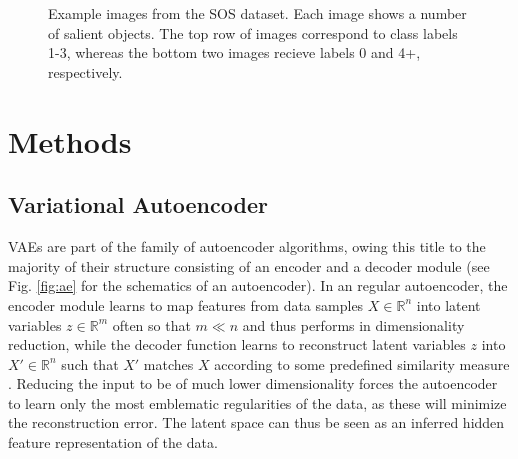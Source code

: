\documentclass[twocolumn]{article}
\begin{document}
\begin{figure}
\centering
    \quad
    \quad
    \quad
    \\\vspace*{0.9em}\\
    \subfloat{\texttt{[image: s0]}}%
    \quad
    \subfloat{\texttt{[image: s4]}}%
    \caption{Example images from the SOS dataset. Each image shows a number of salient objects. The top row of images correspond to class labels 1-3, whereas the bottom two images recieve labels 0 and 4+, respectively.}
\label{fig:sub}
\end{figure}

\hypertarget{methods}{%
\section{Methods}\label{methods}}


\hypertarget{vae}{%
\subsection{Variational Autoencoder}\label{vae}}

VAEs \citep{kingma2013auto} are part of the family of autoencoder algorithms, owing this title
to the majority of their structure consisting of an encoder and a
decoder module \citep{doersch2016tutorial} (see Fig. \ref{fig:ae} for the
schematics of an autoencoder). In an regular autoencoder, the encoder
module learns to map features from data samples \(X \in \mathbb{R}^{n}\)
into latent variables \(z \in \mathbb{R}^{m}\) often so that \(m \ll n\)
and thus performs in dimensionality reduction, while the decoder
function learns to reconstruct latent variables \(z\) into
\(X' \in \mathbb{R}^{n}\) such that \(X'\) matches \(X\) according to
some predefined similarity measure \citep{liou2014autoencoder}. Reducing
the input to be of much lower dimensionality forces the autoencoder to
learn only the most emblematic regularities of the data, as these will
minimize the reconstruction error. The latent space can thus be seen as
an inferred hidden feature representation of the data.
\end{document}
